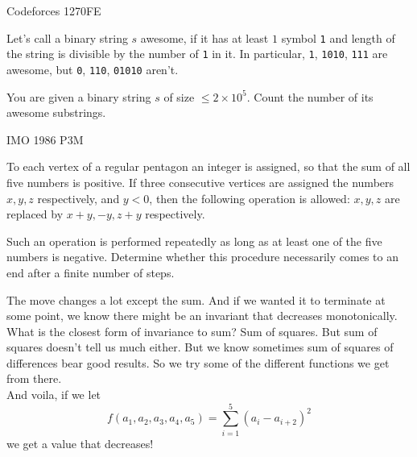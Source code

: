 



{Codeforces 1270F}{E}{
    Let's call a binary string $s$ awesome, if it has at least $1$ symbol
    \texttt{1} and length of the string is divisible by the number of
    \texttt{1} in it. In particular, \texttt{1}, \texttt{1010}, \texttt{111}
    are awesome, but \texttt{0}, \texttt{110}, \texttt{01010} aren't.

    You are given a binary string $ s $ of size $ \le 2\times 10^5 $. Count the
    number of its awesome substrings.  

}




{IMO 1986 P3}{M}{
    To each vertex of a regular pentagon an integer is assigned, so that
    the sum of all five numbers is positive. If three consecutive vertices are
    assigned the numbers $x,y,z$ respectively, and $y<0$, then the following
    operation is allowed: $x,y,z$ are replaced by $x+y,-y,z+y$ respectively. 

    Such an operation is performed repeatedly as long as at least one of the
    five numbers is negative. Determine whether this procedure necessarily
    comes to an end after a finite number of steps.

}

\begin{solution}[invariant]
    The move changes a lot except the sum. And if we wanted it to terminate at
    some point, we know there might be an invariant that decreases
    monotonically. What is the closest form of invariance to sum? Sum of
    squares. But sum of squares doesn't tell us much either. But we know
    sometimes sum of squares of differences bear good results. So we try
    some of the different functions we get from there.\\

    And voila, if we let 
    \[f(a_1, a_2, a_3, a_4, a_5) = \sum^{5}_{i=1} \left(a_i - a_{i+2}\right)^2\]
    we get a value that decreases!
\end{solution}

